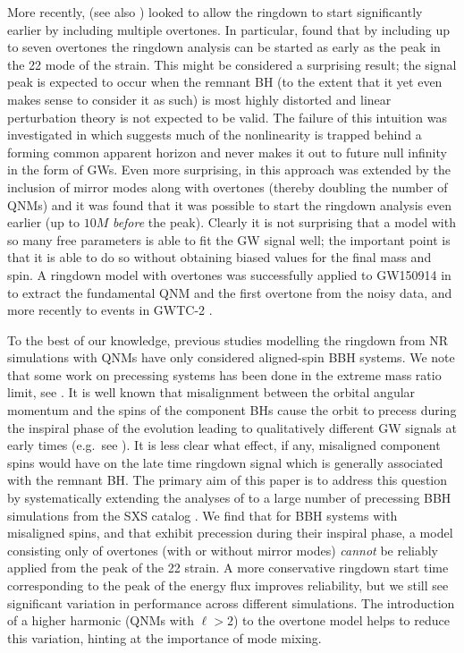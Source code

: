 More recently, \cite{Giesler:2019uxc} (see also \cite{Ota:2019bzl}) looked to allow the ringdown to start significantly earlier by including multiple overtones. 
In particular, \cite{Giesler:2019uxc} found that by including up to seven overtones the ringdown analysis can be started as early as the peak in the 22 mode of the strain. 
This might be considered a surprising result; the signal peak is expected to occur when the remnant BH (to the extent that it yet even makes sense to consider it as such) is most highly distorted and linear perturbation theory is not expected to be valid. 
The failure of this intuition was investigated in \cite{Okounkova:2020vwu} which suggests much of the nonlinearity is trapped behind a forming common apparent horizon and never makes it out to future null infinity in the form of GWs. 
Even more surprising, in \cite{Dhani:2020nik} this approach was extended by the inclusion of mirror modes along with overtones (thereby doubling the number of QNMs) and it was found that it was possible to start the ringdown analysis even earlier (up to ${10M}$ \emph{before} the peak). 
Clearly it is not surprising that a model with so many free parameters is able to fit the GW signal well; the important point is that it is able to do so without obtaining biased values for the final mass and spin. 
A ringdown model with overtones was successfully applied to GW150914 in \cite{Isi:2019aib} to extract the fundamental QNM and the first overtone from the noisy data, and more recently to events in GWTC-2 \cite{LIGOScientific:2020tif}. 

To the best of our knowledge, previous studies modelling the ringdown from NR simulations with QNMs have only considered aligned-spin BBH systems. 
We note that some work on precessing systems has been done in the extreme mass ratio limit, see \cite{Hughes:2019zmt,Lim:2019xrb}. 
It is well known that misalignment between the orbital angular momentum and the spins of the component BHs cause the orbit to precess during the inspiral phase of the evolution leading to qualitatively different GW signals at early times (e.g.\ see \cite{Apostolatos:1994mx}). 
It is less clear what effect, if any, misaligned component spins would have on the late time ringdown signal which is generally associated with the remnant BH. 
The primary aim of this paper is to address this question by systematically extending the analyses of \cite{Giesler:2019uxc, Dhani:2020nik} to a large number of precessing BBH simulations from the SXS catalog \cite{Boyle:2019kee, Mroue:2013xna}. 
We find that for BBH systems with misaligned spins, and that exhibit precession during their inspiral phase, a model consisting only of overtones (with or without mirror modes) \emph{cannot} be reliably applied from the peak of the 22 strain. 
A more conservative ringdown start time corresponding to the peak of the energy flux improves reliability, but we still see significant variation in performance across different simulations. 
The introduction of a higher harmonic (QNMs with $\ell > 2$) to the overtone model helps to reduce this variation, hinting at the importance of mode mixing.

